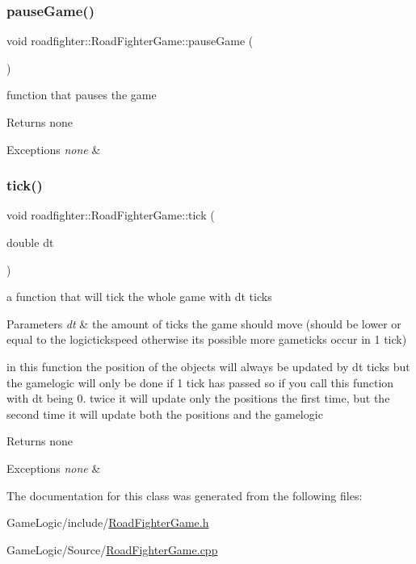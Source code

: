 \subsubsection{\texorpdfstring{pause\+Game()}{pauseGame()}}
{\footnotesize\ttfamily void roadfighter\+::\+Road\+Fighter\+Game\+::pause\+Game (\begin{DoxyParamCaption}{ }\end{DoxyParamCaption})}

function that pauses the game \begin{DoxyReturn}{Returns}
none 
\end{DoxyReturn}

\begin{DoxyExceptions}{Exceptions}
{\em none} & \\
\hline
\end{DoxyExceptions}
\mbox{\label{classroadfighter_1_1RoadFighterGame_a1bbb706a128d1f98e06ea5e0f6ab1581}} 
\subsubsection{\texorpdfstring{tick()}{tick()}}
{\footnotesize\ttfamily void roadfighter\+::\+Road\+Fighter\+Game\+::tick (\begin{DoxyParamCaption}\item[{double}]{dt }\end{DoxyParamCaption})}

a function that will tick the whole game with dt ticks 
\begin{DoxyParams}{Parameters}
{\em dt} & the amount of ticks the game should move (should be lower or equal to the logictickspeed otherwise it\textquotesingle{}s possible more gameticks occur in 1 tick)\\
\hline
\end{DoxyParams}
in this function the position of the objects will always be updated by dt ticks but the gamelogic will only be done if 1 tick has passed so if you call this function with dt being 0. twice it will update only the positions the first time, but the second time it will update both the positions and the gamelogic

\begin{DoxyReturn}{Returns}
none 
\end{DoxyReturn}

\begin{DoxyExceptions}{Exceptions}
{\em none} & \\
\hline
\end{DoxyExceptions}


The documentation for this class was generated from the following files\+:\begin{DoxyCompactItemize}
\item 
Game\+Logic/include/\hyperlink{RoadFighterGame_8h}{Road\+Fighter\+Game.\+h}\item 
Game\+Logic/\+Source/\hyperlink{RoadFighterGame_8cpp}{Road\+Fighter\+Game.\+cpp}\end{DoxyCompactItemize}
